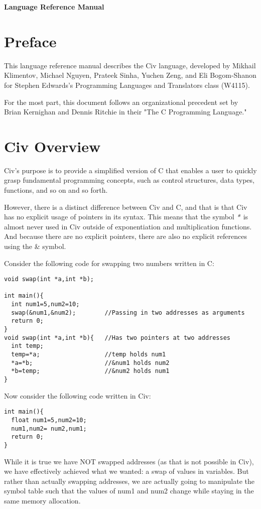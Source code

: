 \documentclass[a4paper]{article}
\def \authors{Mikhail Klimentov, Michael Nguyen, Prateek Sinha, Yuchen Zeng, and Eli Bogom-Shanon }
\begin{document}
\textbf{\huge{Language Reference Manual}}

\section{Preface}

This language reference manual describes the Civ language, developed by \authors for Stephen Edwards's Programming Languages and Translators class (W4115). 

For the most part, this document follows an organizational precedent set by Brian Kernighan and Dennis Ritchie in their "The C Programming Language." 

\section{Civ Overview}

Civ's purpose is to provide a simplified version of C that enables a user to quickly grasp fundamental programming concepts, such as control structures, data types, functions, and so on and so forth.

However, there is a distinct difference between Civ and C, and that is that Civ has no explicit usage of pointers in its syntax. This means that the symbol $\emph{*}$ is almost never used in Civ outside of exponentiation and multiplication functions. And because there are no explicit pointers, there are also no explicit references using the \& symbol.

Consider the following code for swapping two numbers written in C:

\begin{lstlisting}
void swap(int *a,int *b);

int main(){
  int num1=5,num2=10;
  swap(&num1,&num2);        //Passing in two addresses as arguments  
  return 0;
}
void swap(int *a,int *b){   //Has two pointers at two addresses 
  int temp;
  temp=*a;                  //temp holds num1
  *a=*b;                    //&num1 holds num2
  *b=temp;                  //&num2 holds num1
}
\end{lstlisting}

Now consider the following code written in Civ:

\begin{lstlisting}
int main(){
  float num1=5,num2=10;
  num1,num2= num2,num1;
  return 0;
}
\end{lstlisting}

While it is true we have NOT swapped addresses (as that is not possible in Civ), we have effectively achieved what we wanted: a swap of values in variables. But rather than actually swapping addresses, we are actually going to manipulate the symbol table such that the values of num1 and num2 change while staying in the same memory allocation.
\end{document}

